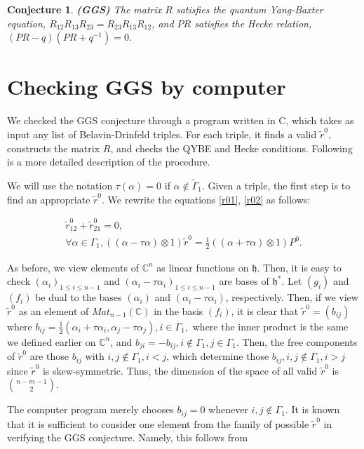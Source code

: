 \documentclass[12pt]{article}
\newtheorem{conj}{Conjecture}[section]
\numberwithin{equation}{section}
\begin{document}
\begin{conj}{\bf (GGS)}  
The matrix $R$ satisfies the quantum Yang-Baxter equation, 
$R_{12} R_{13} R_{23} = R_{23} R_{13} R_{12}$, and $PR$ satisfies 
the Hecke relation, $(PR-q)(PR+q^{-1}) = 0$.
\end{conj}

\section{Checking GGS by computer}

We checked the GGS conjecture through a program written in C, which
takes as input any list of Belavin-Drinfeld triples.  For each triple,
it finds a valid $\tilde r^0$, constructs the matrix $R$, and checks
the QYBE and Hecke conditions.  Following is a more detailed
description of the procedure.

We will use the notation $\tau(\alpha) = 0$ if $\alpha \notin \tilde
\Gamma_1$.  Given a triple, the first step is to find an appropriate
$\tilde r^0$.  We rewrite the equations \eqref{r01}, \eqref{r02} as
follows:

\begin{gather} \label{tr01}
\tilde r^0_{12} + \tilde r^0_{21} = 0, \\ \label{tr02} \forall \alpha
\in \Gamma_1, ((\alpha - \tau \alpha) \otimes 1) \tilde r^0 =
\textstyle{\frac{1}{2}} ((\alpha + \tau \alpha) \otimes 1) P^0.
\end{gather}

As before, we view elements of $\mathbb C^n$ as linear functions on
$\mathfrak h$.  Then, it is easy to check $(\alpha_i)_{1 \leq i \leq
n-1}$ and $(\alpha_i - \tau \alpha_i)_{1 \leq i \leq n-1}$ are bases
of $\mathfrak h^*$.  Let $(g_i)$ and $(f_i)$ be dual to the bases
$(\alpha_i)$ and $(\alpha_i - \tau \alpha_i)$, respectively. Then, if
we view $\tilde r^0$ as an element of $Mat_{n-1}(\mathbb C)$ in the
basis $(f_i)$, it is clear that $\tilde r^0 = (b_{ij})$ where $b_{ij}
= \frac{1}{2} (\alpha_i + \tau \alpha_i, \alpha_j - \tau \alpha_j), i
\in \Gamma_1,$ where the inner product is the same we defined earlier
on $\mathbb C^n$, and $b_{ji} = -b_{ij}, i \notin \Gamma_1, j \in
\Gamma_1$.  Then, the free components of $\tilde r^0$ are those
$b_{ij}$ with $i,j \notin \Gamma_1, i < j$, which determine those
$b_{ij}, i,j \notin \Gamma_1, i > j$ since $\tilde r^0$ is
skew-symmetric.  Thus, the dimension of the space of all valid $\tilde
r^0$ is $n-m-1 \choose 2$.

The computer program merely chooses $b_{ij} = 0$ whenever $i,j \notin
\Gamma_1$.  It is known that it is sufficient to consider one element
from the family of possible $\tilde r^0$ in verifying the GGS
conjecture.  Namely, this follows from
\end{document}
